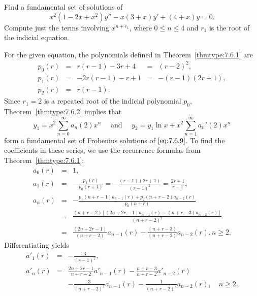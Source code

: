 \documentclass{ximera}
\begin{document}
\begin{example}\label{example:7.6.1}
Find  a fundamental set of solutions of
\begin{equation} \label{eq:7.6.9}
x^2(1-2x+x^2)y''-x(3+x)y'+(4+x)y=0.
\end{equation}
Compute just the terms involving $x^{n+r_1}$, where  $0\leq n\leq 4$
and $r_1$ is the root of the indicial equation.


\begin{explanation}
For the given equation,  the polynomials defined in
Theorem~\ref{thmtype:7.6.1} are
$$
\begin{array}{lllll}
p_0(r)&=&r(r-1)-3r+4&=&(r-2)^2,\\
p_1(r)&=&-2r(r-1)-r+1&=&-(r-1)(2r+1),\\
p_2(r)&=&r(r-1).
\end{array}
$$
Since $r_1=2$ is a repeated root of the indicial polynomial $p_0$,
Theorem~\ref{thmtype:7.6.2} implies that
\begin{equation} \label{eq:7.6.10}
y_1=x^2\sum_{n=0}^\infty  a_n(2)x^n\quad\mbox{ and }\quad
y_2=y_1\ln x+x^2\sum_{n=1}^\infty a_n'(2)x^n
\end{equation}
form a fundamental set of  Frobenius solutions of $\eqref{eq:7.6.9}$.
To find the coefficients in these series, we use the recurrence formulas from Theorem~\ref{thmtype:7.6.1}:
\begin{equation} \label{eq:7.6.11}
\begin{array}{ccl}
a_0(r)&=&1,\\
a_1(r)&=&-\frac{p_1(r)}{p_0(r+1)}
=-\frac{(r-1)(2r+1)}{(r-1)^2}
=\frac{2r+1}{r-1},\\
a_n(r)&=&-\frac{p_1(n+r-1)a_{n-1}(r)+p_2(n+r-2)a_{n-2}(r)}{p_0(n+r)}\\
&=&\frac{(n+r-2)\left[(2n+2r-1)a_{n-1}(r)
-(n+r-3)a_{n-2}(r)\right]}{(n+r-2)^2}\\
&=&\frac{(2n+2r-1)}{(n+r-2)}a_{n-1}(r)-
\frac{(n+r-3)}{(n+r-2)}a_{n-2}(r),n\geq 2.
\end{array}
\end{equation}
Differentiating yields
\begin{equation} \label{eq:7.6.12}
\begin{array}{ccl}
a'_1(r)&=&-\frac{3}{(r-1)^2},\\
a'_n(r)&=&\frac{2n+2r-1}{n+r-2}a'_{n-1}(r)-\frac{n+r-3}{n+r-2}a'_{n-2}(r)\\
&&-\frac{3}{(n+r-2)^2}a_{n-1}(r)-\frac{1}{(n+r-2)^2}a_{n-2}(r),\quad
n\geq 2.
\end{array}
\end{equation}


\end{explanation}
\end{example}
\end{document}
